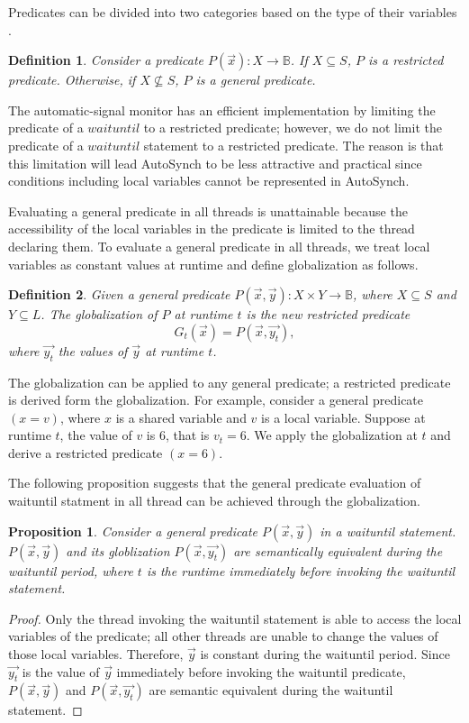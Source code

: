 \documentclass[preprint]{sigplanconf}
\newtheorem{definition}{Definition}
\newtheorem{proposition}{Proposition}
\begin{document}
Predicates can be divided into two categories based on the type of their 
variables \cite{bh05}.
\begin{definition}
    Consider a predicate $P(\vec{x}): X \rightarrow \mathbb{B}$. If $X 
    \subseteq S$, $P$ 
    is a restricted predicate. Otherwise, if $X \not\subseteq S$, $P$ 
    is a general predicate. 
\end{definition}

The automatic-signal monitor has an efficient implementation \cite{kes77} by 
limiting the predicate of a $waituntil$ to a restricted predicate; however, 
we do not limit the predicate of a $waituntil$ statement to a restricted 
predicate. The reason is that this limitation will lead AutoSynch to be less
attractive and practical since conditions including local variables cannot be 
represented in AutoSynch.

Evaluating a general predicate in all threads is unattainable 
because the accessibility of the local variables in the predicate is limited 
to the thread declaring them. To evaluate a general predicate in all 
threads, we treat local variables as constant values at runtime and define 
globalization as follows. 
\begin{definition}
    Given a general predicate $P(\vec{x}, \vec{y}): X \times Y \rightarrow 
    \mathbb{B}$, where $X \subseteq S$ and $Y \subseteq L$. The globalization 
    of $P$ at runtime $t$ is the new restricted predicate
    \[
    G_t(\vec{x}) = P(\vec{x}, \vec{y_t}),
    \]
    where $\vec{y_t}$ the values of $\vec{y}$ at runtime $t$.
\end{definition}

The globalization can be applied to any general predicate; a restricted 
predicate is derived form the globalization. For example, consider a 
general predicate $(x = v)$, where $x$ is a shared variable and $v$ is a local
variable. Suppose at runtime $t$, the value of $v$ is $6$, that is $v_t=6$. We
apply the globalization at $t$ and derive a restricted predicate $(x = 6)$. 

The following proposition suggests that the general predicate evaluation of
waituntil statment in all thread can be achieved through the globalization. 
\begin{proposition} \label{pro:glob}
    Consider a general predicate $P(\vec{x}, \vec{y})$ in a waituntil 
    statement. $P(\vec{x}, \vec{y})$ and its globlization 
    $P(\vec{x}, \vec{y_t})$ are semantically equivalent during the waituntil 
    period, where $t$ is the runtime immediately before invoking the 
    waituntil statement.  
\end{proposition}
\begin{proof}
    Only the thread invoking the waituntil statement is able to access the
    local variables of the predicate; all other threads are unable to change
    the values of those local variables. Therefore, $\vec{y}$ is constant 
    during the waituntil period. Since $\vec{y_t}$ is the value of $\vec{y}$
    immediately before invoking the waituntil predicate, $P(\vec{x}, \vec{y})$
    and $P(\vec{x}, \vec{y_t})$ are semantic equivalent during the waituntil
    statement. 
\end{proof}
\end{document}
